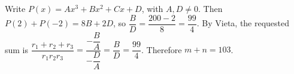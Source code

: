Write $P(x)=Ax^3+Bx^2+Cx+D$, with $A,D\ne0$. Then $P(2)+P(-2)=8B+2D$, so $\dfrac{B}{D}=\dfrac{200-2}{8}=\dfrac{99}{4}$. By Vieta, the requested sum is $\dfrac{r_1+r_2+r_3}{r_1r_2r_3}=\dfrac{-\dfrac{B}{A}}{-\dfrac{D}{A}}=\dfrac{B}{D}=\dfrac{99}{4}$. Therefore $\boxed{m+n=103}$.
